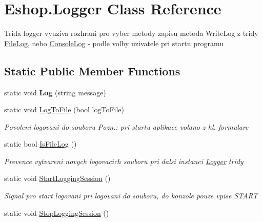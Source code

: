 \hypertarget{class_eshop_1_1_logger}{}\section{Eshop.\+Logger Class Reference}
\label{class_eshop_1_1_logger}


Trida logger vyuziva rozhrani pro vyber metody zapisu metoda Write\+Log z tridy \mbox{\hyperlink{class_eshop_1_1_file_log}{File\+Log}}, nebo \mbox{\hyperlink{class_eshop_1_1_console_log}{Console\+Log}} -\/ podle volby uzivatele pri startu programu  


\subsection*{Static Public Member Functions}
\begin{DoxyCompactItemize}
\item 
\mbox{\label{class_eshop_1_1_logger_a2782d4b09392063cdf1872eb6ba24739}} 
static void {\bfseries Log} (string message)
\item 
static void \mbox{\hyperlink{class_eshop_1_1_logger_ab21c57ec7099cbb095b4f289bdc15676}{Log\+To\+File}} (bool log\+To\+File)
\begin{DoxyCompactList}\small\item\em Povoleni logovani do souboru Pozn.\+: pri startu aplikace volano z hl. formulare \end{DoxyCompactList}\item 
static bool \mbox{\hyperlink{class_eshop_1_1_logger_a832a728edf66096ec757eecf323dc8b5}{Is\+File\+Log}} ()
\begin{DoxyCompactList}\small\item\em Prevence vytvareni novych logovacich souboru pri dalsi instanci \mbox{\hyperlink{class_eshop_1_1_logger}{Logger}} tridy \end{DoxyCompactList}\item 
static void \mbox{\hyperlink{class_eshop_1_1_logger_a9643291c2f9db09c69dd48524f8ec123}{Start\+Logging\+Session}} ()
\begin{DoxyCompactList}\small\item\em Signal pro start logovani pri logovani do souboru, do konzole pouze vpise S\+T\+A\+RT \end{DoxyCompactList}\item 
static void \mbox{\hyperlink{class_eshop_1_1_logger_a196bbedf3be2194ea2e4abf83d25fc8a}{Stop\+Logging\+Session}} ()

\end{DoxyCompactItemize}
